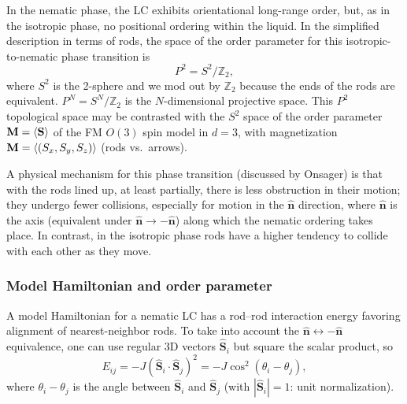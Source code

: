 In the nematic phase, the LC exhibits orientational long-range order, but, as in the isotropic phase, no positional
ordering within the liquid. In the simplified description in terms of rods, the space of the order parameter for this
isotropic-to-nematic phase transition is
\begin{equation}
  P^2 = S^2/\mathbb{Z}_2,
\end{equation}
where $S^2$ is the 2-sphere and we mod out by $\mathbb{Z}_2$ because the ends of the rods are equivalent.
$P^N = S^N/\mathbb{Z}_2$ is the $N$-dimensional projective space. This $P^2$ topological space may be contrasted with the
$S^2$ space of the order parameter $\mathbf M = \langle \mathbf S\rangle$ of the FM $O(3)$ spin model in $d = 3$, with magnetization
$\mathbf M = \langle (S_x,S_y,S_z)\rangle$ (rods vs.\ arrows).

A physical mechanism for this phase transition (discussed by Onsager) is that with the rods lined up, at least
partially, there is less obstruction in their motion; they undergo fewer collisions, especially for motion in the
$\hat{\mathbf n}$ direction, where $\hat{\mathbf n}$ is the axis (equivalent under $\hat{\mathbf n}\to-\hat{\mathbf n}$)
along which the nematic ordering takes place. In contrast, in the isotropic phase rods have a higher tendency to collide
with each other as they move.

\subsubsection*{Model Hamiltonian and order parameter}

A model Hamiltonian for a nematic LC has a rod--rod interaction energy favoring alignment of nearest-neighbor rods. To
take into account the $\hat{\mathbf n}\leftrightarrow-\hat{\mathbf n}$ equivalence, one can use regular 3D vectors
$\hat{\mathbf S}_i$ but square the scalar product, so
\begin{equation}
  E_{ij} = -J(\hat{\mathbf S}_i\cdot\hat{\mathbf S}_j)^2 = -J\cos^2(\theta_i-\theta_j),
\end{equation}
where $\theta_i-\theta_j$ is the angle between $\hat{\mathbf S}_i$ and $\hat{\mathbf S}_j$ (with $|\hat{\mathbf S}_i| = 1$:
unit normalization).

